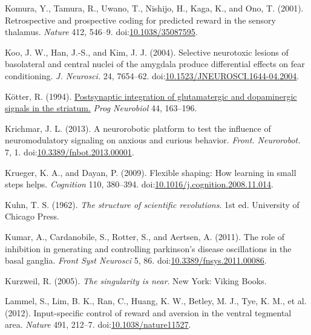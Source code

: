 \documentclass[
  11pt,
  a4paper,
]{scrbook}
\newlength{\cslhangindent}
\newenvironment{CSLReferences}[2] %
 {\begin{list}{}{%
  \setlength{\itemindent}{0pt}
  \setlength{\leftmargin}{0pt}
  \setlength{\parsep}{0pt}
  \ifodd #1
   \setlength{\leftmargin}{\cslhangindent}
   \setlength{\itemindent}{-1\cslhangindent}
  \fi
  \setlength{\itemsep}{#2\baselineskip}}}
 {\end{list}}
\begin{document}
\begin{CSLReferences}{1}{1}
Komura, Y., Tamura, R., Uwano, T., Nishijo, H., Kaga, K., and Ono, T.
(2001). {Retrospective and prospective coding for predicted reward in
the sensory thalamus.} \emph{Nature} 412, 546--9.
doi:\href{https://doi.org/10.1038/35087595}{10.1038/35087595}.

Koo, J. W., Han, J.-S., and Kim, J. J. (2004). {Selective neurotoxic
lesions of basolateral and central nuclei of the amygdala produce
differential effects on fear conditioning.} \emph{J. Neurosci.} 24,
7654--62.
doi:\href{https://doi.org/10.1523/JNEUROSCI.1644-04.2004}{10.1523/JNEUROSCI.1644-04.2004}.

Kötter, R. (1994).
\href{https://www.ncbi.nlm.nih.gov/pubmed/7831476}{Postsynaptic
integration of glutamatergic and dopaminergic signals in the striatum.}
\emph{Prog Neurobiol} 44, 163--196.

Krichmar, J. L. (2013). {A neurorobotic platform to test the influence
of neuromodulatory signaling on anxious and curious behavior.}
\emph{Front. Neurorobot.} 7, 1.
doi:\href{https://doi.org/10.3389/fnbot.2013.00001}{10.3389/fnbot.2013.00001}.

Krueger, K. A., and Dayan, P. (2009). Flexible shaping: How learning in
small steps helps. \emph{Cognition} 110, 380--394.
doi:\href{https://doi.org/10.1016/j.cognition.2008.11.014}{10.1016/j.cognition.2008.11.014}.

Kuhn, T. S. (1962). \emph{The structure of scientific revolutions}. 1st
ed. University of Chicago Press.

Kumar, A., Cardanobile, S., Rotter, S., and Aertsen, A. (2011). The role
of inhibition in generating and controlling parkinson's disease
oscillations in the basal ganglia. \emph{Front Syst Neurosci} 5, 86.
doi:\href{https://doi.org/10.3389/fnsys.2011.00086}{10.3389/fnsys.2011.00086}.

Kurzweil, R. (2005). \emph{The singularity is near}. New York: Viking
Books.

Lammel, S., Lim, B. K., Ran, C., Huang, K. W., Betley, M. J., Tye, K.
M., et al. (2012). {Input-specific control of reward and aversion in the
ventral tegmental area.} \emph{Nature} 491, 212--7.
doi:\href{https://doi.org/10.1038/nature11527}{10.1038/nature11527}.


\end{CSLReferences}
\end{document}
